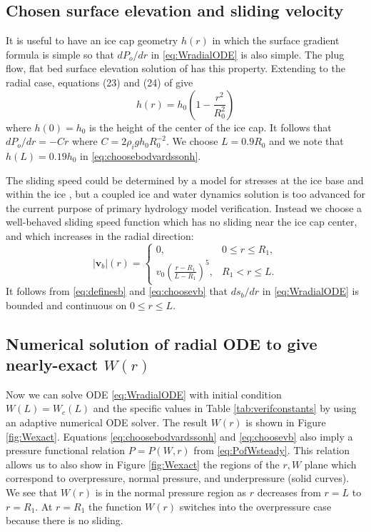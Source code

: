 \documentclass[11pt,final]{amsart}%
\newcommand\bv{\mathbf{v}}
\begin{document}
\subsection*{Chosen surface elevation and sliding velocity}  It is useful to have an ice cap geometry $h(r)$ in which the surface gradient formula is simple so that $dP_o/dr$ in \eqref{eq:WradialODE} is also simple.  The plug flow, flat bed surface elevation solution of \cite{Bodvardsson} has this property.  Extending to the radial case, equations (23) and (24) of \citep{Bodvardsson} give
\begin{equation}
h(r) = h_0 \left(1 - \frac{r^2}{R_0^2} \right) \label{eq:choosebodvardssonh}
\end{equation}
where $h(0)=h_0$ is the height of the center of the ice cap.  It follows that $dP_o/dr = - C r$ where $C=2\rho_i g h_0 R_0^{-2}$.  We choose $L=0.9 R_0$ and we note that $h(L)=0.19 h_0$ in \eqref{eq:choosebodvardssonh}.

The sliding speed could be determined by a model for stresses at the ice base and within the ice \citep{GreveBlatter2009}, but a coupled ice and water dynamics solution is too advanced for the current purpose of primary hydrology model verification.  Instead we choose a well-behaved sliding speed function which has no sliding near the ice cap center, and which increases in the radial direction:
\begin{equation}
|\bv_b|(r) = \begin{cases} 0, & 0 \le r \le R_1, \\
                           v_0  \left(\frac{r-R_1}{L-R_1}\right)^5, & R_1 < r \le L.
             \end{cases}  \label{eq:choosevb}
\end{equation}
It follows from \eqref{eq:definesb} and \eqref{eq:choosevb} that $ds_b/dr$ in \eqref{eq:WradialODE} is bounded and continuous on $0\le r \le L$.

\subsection*{Numerical solution of radial ODE to give nearly-exact $W(r)$}  Now we can solve ODE \eqref{eq:WradialODE} with initial condition $W(L)=W_c(L)$ and the specific values in Table \ref{tab:verifconstants} by using an adaptive numerical ODE solver.  The result $W(r)$ is shown in Figure \ref{fig:Wexact}.  Equations \eqref{eq:choosebodvardssonh} and \eqref{eq:choosevb} also imply a pressure functional relation $P=P(W,r)$ from \eqref{eq:PofWsteady}.  This relation allows us to also show in Figure \ref{fig:Wexact} the regions of the $r,W$ plane which correspond to overpressure, normal pressure, and underpressure (solid curves).  We see that $W(r)$ is in the normal pressure region as $r$ decreases from $r=L$ to $r=R_1$.  At $r=R_1$ the function $W(r)$ switches into the overpressure case because there is no sliding.
\end{document}
